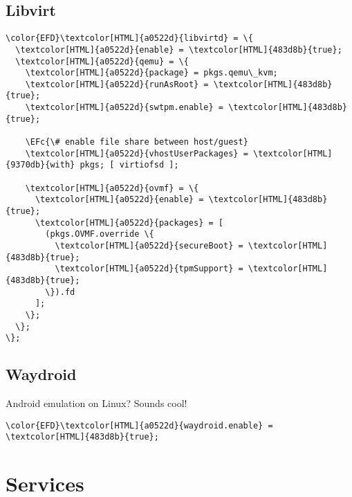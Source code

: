 \documentclass[14pt]{article}
\newcommand{\EFc}[1]{\textcolor{EFc}{#1}} %
\begin{document}
\subsection{Libvirt}
\label{sec:orgc6188af}
\begin{Code}
\begin{Verbatim}
\color{EFD}\textcolor[HTML]{a0522d}{libvirtd} = \{
  \textcolor[HTML]{a0522d}{enable} = \textcolor[HTML]{483d8b}{true};
  \textcolor[HTML]{a0522d}{qemu} = \{
    \textcolor[HTML]{a0522d}{package} = pkgs.qemu\_kvm;
    \textcolor[HTML]{a0522d}{runAsRoot} = \textcolor[HTML]{483d8b}{true};
    \textcolor[HTML]{a0522d}{swtpm.enable} = \textcolor[HTML]{483d8b}{true};

    \EFc{\# enable file share between host/guest}
    \textcolor[HTML]{a0522d}{vhostUserPackages} = \textcolor[HTML]{9370db}{with} pkgs; [ virtiofsd ];

    \textcolor[HTML]{a0522d}{ovmf} = \{
      \textcolor[HTML]{a0522d}{enable} = \textcolor[HTML]{483d8b}{true};
      \textcolor[HTML]{a0522d}{packages} = [
        (pkgs.OVMF.override \{
          \textcolor[HTML]{a0522d}{secureBoot} = \textcolor[HTML]{483d8b}{true};
          \textcolor[HTML]{a0522d}{tpmSupport} = \textcolor[HTML]{483d8b}{true};
        \}).fd
      ];
    \};
  \};
\};
\end{Verbatim}
\end{Code}
\subsection{Waydroid}
\label{sec:org871588b}
Android emulation on Linux? Sounds cool!
\begin{Code}
\begin{Verbatim}
\color{EFD}\textcolor[HTML]{a0522d}{waydroid.enable} = \textcolor[HTML]{483d8b}{true};
\end{Verbatim}
\end{Code}
\section{Services}
\label{sec:org55d5572}
\end{document}
